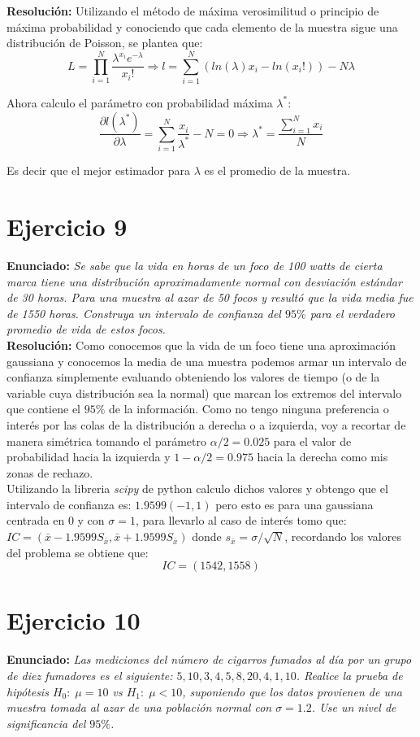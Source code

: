 \documentclass[twocolumn]{article}
\begin{document}
\textbf{Resolución:} Utilizando el método de máxima verosimilitud o principio de máxima probabilidad y conociendo que cada elemento de la muestra sigue una distribución de Poisson, se plantea que:
\[
L =\prod_{i=1}^N \frac{\lambda^{x_i}e^{-\lambda}}{x_i!} \Longrightarrow l = \sum_{i=1}^N (ln(\lambda)x_i-ln(x_i!)) - N\lambda
\]

Ahora calculo el parámetro con probabilidad máxima $\lambda^*$:
\[
\frac{\partial l(\lambda^*)}{\partial \lambda}= \sum_{i=1}^N \frac{x_i}{\lambda^*} -N =0 \Longrightarrow  \lambda^*= \frac{\sum_{i=1}^Nx_i}{N}
\]

Es decir que el mejor estimador para $ \lambda$ es el promedio de la muestra. 

\section{Ejercicio 9}
\textbf{Enunciado:}
\textit{Se sabe que la vida en horas de un foco de 100 watts de cierta marca tiene una distribución aproximadamente normal con desviación estándar de 30 horas. Para una muestra al azar de 50 focos y resultó que la vida media fue de 1550 horas. Construya un intervalo de confianza del $95\%$ para el verdadero promedio de vida de estos focos.}\\

\textbf{Resolución:} Como conocemos que la vida de un foco tiene una aproximación gaussiana y conocemos la media de una muestra podemos armar un intervalo de confianza simplemente evaluando obteniendo los valores de tiempo (o de la variable cuya distribución sea la normal) que marcan los extremos del intervalo que contiene el $95\%$ de la información. Como no tengo ninguna preferencia o interés por las colas de la distribución a derecha o a izquierda, voy a recortar de manera simétrica tomando el parámetro $ \alpha/2=0.025$ para el valor de probabilidad hacia la izquierda y $1-\alpha/2=0.975$ hacia la derecha como mis zonas de rechazo.\\

Utilizando la libreria \textit{scipy} de python calculo dichos valores y obtengo que el intervalo de confianza es: $1.9599(-1,1)$  pero esto es para una gaussiana centrada en $ 0 $ y con $\sigma=1$, para llevarlo al caso de interés tomo que: $ IC= (\bar{x}-1.9599S_{\bar{x}},\bar{x}+1.9599S_{\bar{x}})$ donde $s_{\bar{x}}= \sigma/\sqrt{N}$, recordando los valores del problema se obtiene que:
\[
IC= (1542,1558)
\]


\section{Ejercicio 10}
\textbf{Enunciado:}
\textit{Las mediciones del número de cigarros fumados al día por un grupo de diez fumadores es el siguiente: $5, 10, 3, 4, 5, 8, 20, 4, 1, 10$. Realice la prueba de hipótesis $H_0 :\; \mu = 10 $ vs $H_1 :\; \mu < 10$, suponiendo que los datos provienen de una muestra tomada al azar de una población normal con $\sigma = 1.2$. Use un nivel de significancia del $95\%$.}\\
\end{document}

